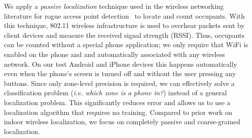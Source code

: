 We apply a {\it passive localization} technique used in the wireless networking literature for rogue access point detection~\cite{Faria2006, Laurendeau2010} to locate and count occupants. With this technique, 802.11 wireless infrastructure is used to overhear packets sent by client devices and measure the received signal strength (RSSI). Thus, occupants can be counted without a special phone application; we only require that WiFi is enabled on the phone and and automatically associated with any wireless network. On our test Android and iPhone devices this happens automatically even when the phone's screen is turned off and without the user pressing any buttons. Since only zone-level precision is required, we can effectively solve a classification problem ({\it i.e. which zone is a phone in?}) instead of a general localization problem. This significantly reduces error and allows us to use a localization algorithm that requires no training. Compared to prior work on indoor wireless localization, we focus on completely passive and coarse-grained localization.









